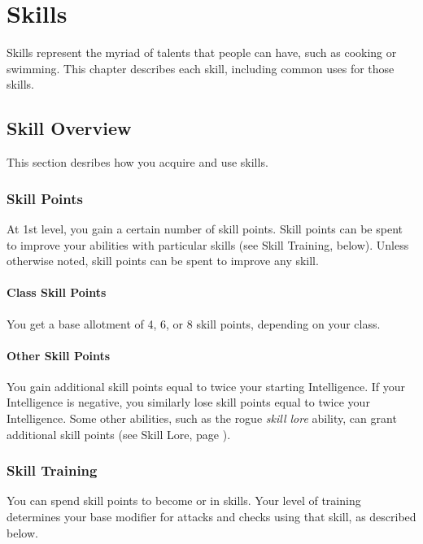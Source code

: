 \chapter{Skills}\label{Skills}

Skills represent the myriad of talents that people can have, such as cooking or swimming.
This chapter describes each skill, including common uses for those skills.

\section{Skill Overview}

    This section desribes how you acquire and use skills.

    \subsection{Skill Points}\label{Skill Points}

        At 1st level, you gain a certain number of skill points. Skill points can be spent to improve your abilities with particular skills (see Skill Training, below).
        Unless otherwise noted, skill points can be spent to improve any skill.

        \subsubsection{Class Skill Points}

            You get a base allotment of 4, 6, or 8 skill points, depending on your class.

        \subsubsection{Other Skill Points}

            You gain additional skill points equal to twice your starting Intelligence.
            If your Intelligence is negative, you similarly lose skill points equal to twice your Intelligence.
            Some other abilities, such as the rogue \textit{skill lore} ability, can grant additional skill points (see Skill Lore, page ).

    \subsection{Skill Training}\label{Skill Training}

        You can spend skill points to become  or  in skills.
        Your level of training determines your base modifier for attacks and checks using that skill, as described below.

